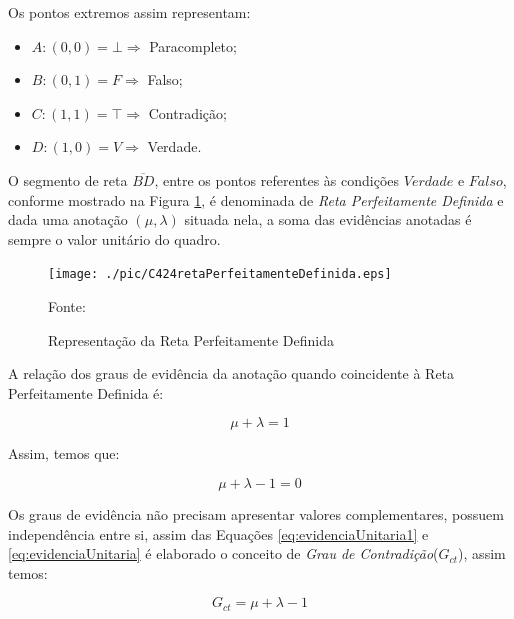 Os pontos extremos assim representam:

\begin{itemize}
\item $A: (0,0) = \bot \Rightarrow $ Paracompleto;
\item $B: (0,1) = F \Rightarrow $ Falso;
\item $C: (1,1) = \top \Rightarrow $ Contradição;
\item $D: (1,0) = V \Rightarrow $ Verdade.
\end{itemize}

O segmento de reta $\overline{BD}$, entre os pontos referentes às condições $Verdade$ e $Falso$, conforme mostrado na Figura \ref{fig:retaPerfeitamenteDefinida}, é denominada de \emph{Reta Perfeitamente Definida} e dada uma anotação $(\mu, \lambda )$ situada nela, a soma das evidências anotadas é sempre o valor unitário do quadro. 

\begin{figure}[!htb]
\centering
\caption{Representação da Reta Perfeitamente Definida}
\center\texttt{[image: ./pic/C424retaPerfeitamenteDefinida.eps]}
\label{fig:retaPerfeitamenteDefinida}

{\small Fonte: \cite{JoaoInacio}}
\end{figure}

A relação dos graus de evidência da anotação quando coincidente à Reta Perfeitamente Definida é: 

\begin{center}
\begin{equation}
\mu + \lambda = 1
\label{eq:evidenciaUnitaria1}
\end{equation}
\end{center}

Assim, temos que:

\begin{center}
\begin{equation}
\mu + \lambda - 1 = 0
\label{eq:evidenciaUnitaria}
\end{equation}
\end{center}


Os graus de evidência não precisam apresentar valores complementares, possuem independência entre si, assim das Equações  
\ref{eq:evidenciaUnitaria1} e 
\ref{eq:evidenciaUnitaria} 
é elaborado o conceito de 
\emph{Grau de Contradição}($G_{ct}$), 
assim temos: 

\begin{center}
\begin{equation}
G _{ct} = \mu + \lambda - 1
\label{eq:grauIncerteza}
\end{equation}
\end{center}

